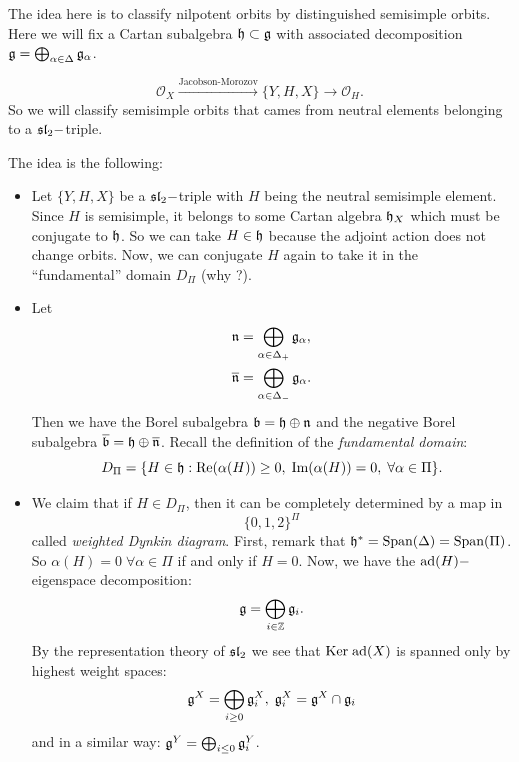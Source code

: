 The idea here is to classify nilpotent orbits by distinguished semisimple orbits. Here we will fix 
a Cartan subalgebra $\mathfrak{h}\subset \mathfrak{g}$ with associated decomposition $\mathfrak{g}=\bigoplus_{\alpha\in\Delta}\mathfrak{g}_\alpha$.

\begin{equation}
    \mathcal{O}_X\overset{\text{Jacobson-Morozov}}{\longrightarrow}\{Y,H,X\}\to\mathcal{O}_H.
\end{equation}
So we will classify semisimple orbits that cames from neutral elements belonging to a $\mathfrak{sl}_2-$triple. 

The idea is the following:
\begin{itemize}
    \item Let $\{Y,H,X\}$ be a $\mathfrak{sl}_2-$triple with $H$ being the neutral semisimple element. Since $H$ is semisimple, it 
    belongs to some Cartan algebra $\mathfrak{h}_X$ which must be conjugate to $\mathfrak{h}$. So we can take $H\in\mathfrak{h}$ because the 
    adjoint action does not change orbits. Now, we can conjugate $H$ again to take it in the ``fundamental'' 
    domain $D_\Pi$ (why ?).
    \item Let 
    \begin{equation}
        \begin{split}
            &\mathfrak{n}=\bigoplus_{\alpha\in\Delta_+}\mathfrak{g}_\alpha,\\
            &\overline{\mathfrak{n}}=\bigoplus_{\alpha\in\Delta_-}\mathfrak{g}_\alpha.
        \end{split}
    \end{equation}
    Then we have the Borel subalgebra $\mathfrak{b}=\mathfrak{h}\oplus \mathfrak{n}$ and the negative Borel 
    subalgebra $\overline{\mathfrak{b}}=\mathfrak{h}\oplus \overline{\mathfrak{n}}$. Recall the definition of the 
    \textit{fundamental domain}:
    \begin{equation}
        D_\Pi=\{H\in\mathfrak{h}: \text{Re}(\alpha(H))\geq0,\;\text{Im}(\alpha(H))=0,\;\forall\alpha\in\Pi\}.
    \end{equation}
    
    \item We claim that if $H\in D_\Pi$, then it can be completely determined by a map in
    \begin{equation}
        \{0,1,2\}^\Pi
    \end{equation}
    called \textit{weighted Dynkin diagram}. First, 
    remark that $\mathfrak{h}^*=\text{Span}(\Delta)=\text{Span}(\Pi)$. So $\alpha(H)=0\;\forall\alpha\in \Pi$ if and 
    only if $H=0$. Now, we have the $\text{ad}(H)-$eigenspace decomposition:
    \begin{equation}
        \mathfrak{g}=\bigoplus_{i\in\mathbb{Z}}\mathfrak{g}_i.
    \end{equation}
    By the representation theory of $\mathfrak{sl}_2$ we see that $\text{Ker}\;\text{ad}(X)$ is spanned only by highest weight spaces:
    \begin{equation}
        \mathfrak{g}^X=\bigoplus_{i\geq0}\mathfrak{g}_i^X,\;\mathfrak{g}_i^X=\mathfrak{g}^X\cap\mathfrak{g}_i
    \end{equation}
    and in a similar way: $\mathfrak{g}^Y=\bigoplus_{i\leq0}\mathfrak{g}_i^Y$.


\end{itemize}
